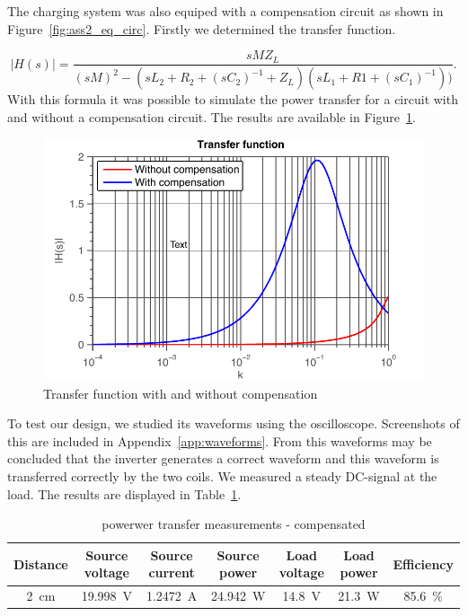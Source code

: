 \documentclass[11pt,titlepage]{report}
\begin{document}
The charging system was also equiped with a compensation circuit as shown in Figure~\ref{fig:ass2_eq_circ}. Firstly we determined the transfer function.

\begin{equation} \label{eq:ass3-transfer-function}
	|H(s)| = \frac{s M Z_L}{(s M)^2 - (s L_2 + R_2 + (s C_2)^{-1} + Z_L) ( s L_1 + R1 + (s C_1)^{-1}))} .
\end{equation}
With this formula it was possible to simulate the power transfer for a circuit with and without a compensation circuit. The results are available in Figure~\ref{fig:ass2-transfer-function}.

\begin{figure}[H]
	\begin{center}
		\includegraphics[width=0.8\linewidth]{resource/transfer-function-rc.pdf}
	\end{center}
	\caption{Transfer function with and without compensation}
	\label{fig:ass2-transfer-function}
\end{figure}


 To test our design, we studied its waveforms using the oscilloscope. Screenshots of this are included in Appendix~\ref{app:waveforms}. From this waveforms may be concluded that the inverter generates a correct waveform and this waveform is transferred correctly by the two coils. We measured a steady DC-signal at the load. The results are displayed in Table~\ref{tab:ass2_power}.


\begin{table}[H]
	\centering
	\begin{tabular}{c c c c c c c}
		\hline\hline
		Distance & Source voltage & Source current & Source power & Load voltage & Load power & Efficiency \\
		\hline
		\SI{2}{cm} & \SI{19.998}{V} & \SI{1.2472}{A} & \SI{24.942}{W} & \SI{14.8}{V} & \SI{21.3}{W} & \SI{85.6}{\percent} \\
		\hline
		\end{tabular}
			\caption{powerwer transfer measurements - compensated}
			\label{tab:ass2_power}
\end{table}
\end{document}
